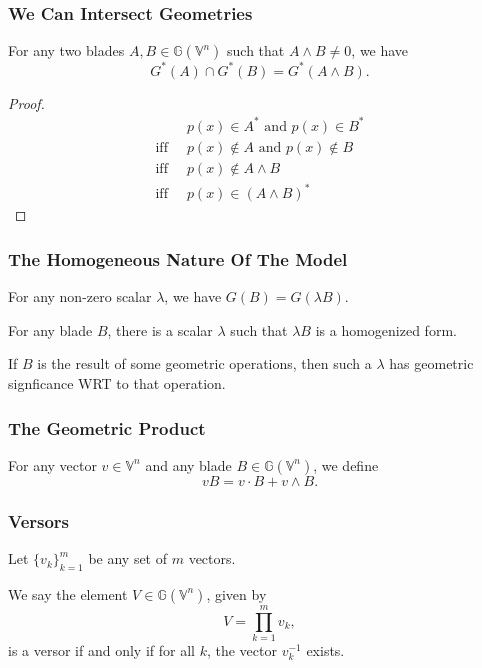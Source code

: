 \documentclass{beamer}
\newcommand{\G}{\mathbb{G}}
\newcommand{\V}{\mathbb{V}}
\begin{document}
\begin{frame}
\frametitle{We Can Intersect Geometries}
\begin{lemma}
For any two blades $A,B\in\G(\V^n)$ such that $A\wedge B\neq 0$,
we have
\begin{equation*}
G^*(A)\cap G^*(B)=G^*(A\wedge B).
\end{equation*}
\end{lemma}
\begin{proof}
\begin{align*}
 & \mbox{$p(x)\in A^*$ and $p(x)\in B^*$} \\
\mbox{iff}\;\; & \mbox{$p(x)\not\in A$ and $p(x)\not\in B$} \\
\mbox{iff}\;\; & \mbox{$p(x)\not\in A\wedge B$} \\
\mbox{iff}\;\; & \mbox{$p(x)\in(A\wedge B)^*$}
\end{align*}
\end{proof}
\end{frame}

\begin{frame}
\frametitle{The Homogeneous Nature Of The Model}
For any non-zero scalar $\lambda$, we have $G(B)=G(\lambda B)$.

For any blade $B$, there is a scalar $\lambda$ such that $\lambda B$ is a homogenized form.

If $B$ is the result of some geometric operations, then such a $\lambda$ has geometric signficance
WRT to that operation.
\end{frame}

\begin{frame}
\frametitle{The Geometric Product}
\begin{definition}
For any vector $v\in\V^n$ and any blade $B\in\G(\V^n)$, we define
\begin{equation*}
vB = v\cdot B + v\wedge B.
\end{equation*}
\end{definition}
\end{frame}

\begin{frame}
\frametitle{Versors}
Let $\{v_k\}_{k=1}^m$ be any set of $m$ vectors.
\begin{definition}
We say the element $V\in\G(\V^n)$, given by
\begin{equation*}
V = \prod_{k=1}^m v_k,
\end{equation*}
is a versor if and only if for all $k$, the vector $v_k^{-1}$ exists.
\end{definition}
\end{frame}
\end{document}
